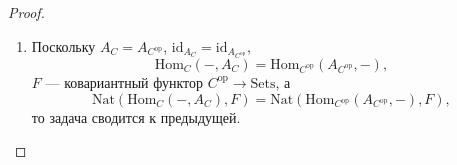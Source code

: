 \documentclass[12pt,a4paper]{article}
\newcommand{\op}{\mathrm{op}}
\newcommand{\Hom}{\mathrm{Hom}}
\newcommand{\id}{\mathrm{id}}
\newcommand{\Sets}{\mathrm{Sets}}
\newcommand{\Nat}{\mathrm{Nat}}
\begin{document}
\begin{proof}
\begin{enumerate}
                Тогда возьмём всякое $a \in F(A)$ и определим $\tau_X(f) := F(f)(a)$. Т.е. попытаемся восстановить $\tau$ для $\tau_A(\id_A) = a$. Совокупность $\{\tau_X\}$ мы восстановили, осталось проверить, что тогда $\tau$ действительно является естественным преобразованием.
                \[
                    \vcenter{
                        \xymatrix{
                            \Hom(A, X) \ar[rrr]^{h_A(k): f \mapsto k \circ f} \ar[dd]_{\rotatebox{-90}{$\scriptstyle\tau_X: f \mapsto F(f)(a)$}}&&& \Hom(A, Y) \ar[dd]^{\rotatebox{-90}{$\scriptstyle\tau_Y: g \mapsto F(g)(a)$}}\\
                            & X \ar[r]^{k} \ar[lu]_{h_A} \ar[ld]^{F}& Y \ar[ru]^{h_A} \ar[rd]_{F}&\\
                            F(A) \ar[rrr]_{F(k)}&&& F(X)
                        }
                    }
                    \qquad
                    \vcenter{
                        \xymatrix{
                            f \ar@{|->}[r]^{h_A(k)} \ar@{|->}[d]_{\tau_A}& k \circ f \ar@{|->}[d]^(0.35){\tau_X}\\
                            F(f)(a) \ar@{|->}[r]_(0.4){F(k)}& {\begin{gathered}
                                \vspace{-0.8em}F(k \circ f)(a)\\
                                \rotatebox{-90}{$\overset{\rotatebox{90}{$\scriptstyle?$}}{=}$}\\
                                F(k)(F(f)(a))
                            \end{gathered}}
                        }
                    }
                \]
                Несложно видеть по нарисованным диаграммам, что вся суть проблемы коммутативности диаграммы заключается в доказательстве того, что $F(k)(F(f)(a)) = F(k \circ f)(a)$, т.е. $F(k) \circ F(f) = F(k \circ f)$. Но это следует из того, что $F$ функтор. Это значит, что $\Lambda$ --- сюръекция.
        
                Таким образом $F$ --- биекция с простым описанием.
            \item Поскольку $A_C = A_{C^\op}$, $\id_{A_C} = \id_{A_{C^\op}}$,
                \[\Hom_C({-}, A_C) = \Hom_{C^\op}(A_{C^\op}, {-}),\]
                $F$ --- ковариантный функтор $C^\op \to \Sets$, а
                \[\Nat(\Hom_C({-}, A_C), F) = \Nat(\Hom_{C^\op}(A_{C^\op}, {-}), F),\]
                то задача сводится к предыдущей.
        \end{enumerate}
    \end{proof}
\end{document}
